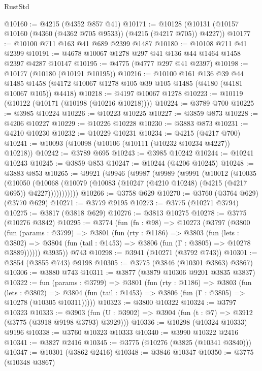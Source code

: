 \begin{lexlean}{RustStd}
\begin{coremodule}
@10160 := @4215 (@4352 @857 @41)
@10171 := @10128 (@10131 (@10157 @10160 (@4360 (@4362 @705 @9533)) (@4215 (@4217 @705)) @4227))
@10177 := @10100 @711 @163 @41 @689 @2399 @1487
@10180 := @10108 @711 @41 @2399
@10191 := @4678 @10067 @1278 @297 @41 @136 @44 @1464 @1458 @2397 @4287 @10147
@10195 := @4775 (@4777 @297 @41 @2397)
@10198 := @10177 (@10180 (@10191 @10195))
@10216 := @10100
    @161
    @136
    @39
    @44
    @1485
    @1458
    (@4172 @10067 @1278 @105 @39 @105 @1485 (@4180 (@4181 @10067 @105)) @4418)
@10218 := @4197 @10067 @1278
@10223 := @10119 (@10122 (@10171 (@10198 (@10216 @10218))))
@10224 := @3789 @700
@10225 := @3985 @10224
@10226 := @10223 @10225
@10227 := @3859 @873
@10228 := @4206 @10227
@10229 := @10226 @10228
@10230 := @3883 @873
@10231 := @4210 @10230
@10232 := @10229 @10231
@10234 := @4215 (@4217 @700)
@10241 := @10093 (@10098 (@10106 (@10111 (@10232 @10234 @4227)) @10218))
@10242 := @3789 @695
@10243 := @3985 @10242
@10244 := @10241 @10243
@10245 := @3859 @853
@10247 := @10244 (@4206 @10245)
@10248 := @3883 @853
@10265 := @9921
    (@9946
      (@9987
        (@9989
          (@9991
            (@10012
              (@10035
                (@10050
                  (@10068
                    (@10079 (@10083 (@10247 (@4210 @10248) (@4215 (@4217 @695)) @4227)))))))))))
@10266 := @3758 @629
@10270 := @3760 (@3764 @629) (@3770 @629)
@10271 := @3779 @9195
@10273 := @3775 (@10271 @3794)
@10275 := @3817 (@3818 @629)
@10276 := @3813 @10275
@10278 := @3775 (@10276 @3842)
@10295 := @3774
    (fun (fn : @98) =>
    @10273
      (@3797
        (@3800
          (fun (params : @3799) =>
          @3801
            (fun (rty : @1186) =>
            @3803
              (fun (lets : @3802) =>
              @3804 (fun (tail : @1453) => @3806 (fun (Γ : @3805) => @10278 @3889))))))
        @3935))
    @743
@10298 := @3941 (@10271 (@3792 @743))
@10301 := @3854 (@3855 @743) @9198
@10305 := @3775 (@3846 (@10301 @3863) @3867)
@10306 := @3880 @743
@10311 := @3877 (@3879 @10306 @9201 @3835 @3837)
@10322 := fun (params : @3799) =>
  @3801
    (fun (rty : @1186) =>
    @3803
      (fun (lets : @3802) =>
      @3804 (fun (tail : @1453) => @3806 (fun (Γ : @3805) => @10278 (@10305 @10311)))))
@10323 := @3800 @10322
@10324 := @3797 @10323
@10333 := @3903 (fun (U : @3902) => @3904 (fun (t : @7) => @3912 (@3775 (@3918 @9198 @3793) @3929)))
@10336 := @10298 (@10324 @10333) @9196
@10338 := @3760 @10323 @10333
@10340 := @3990 @10322 @2416
@10341 := @3827 @2416
@10345 := @3775 (@10276 (@3825 (@10341 @3840)))
@10347 := @10301 (@3862 @2416)
@10348 := @3846 @10347
@10350 := @3775 (@10348 @3867)

\end{coremodule}
\end{lexlean}
